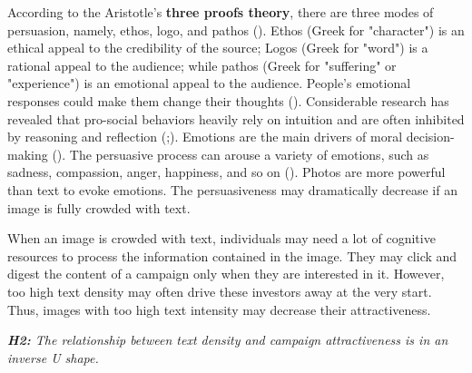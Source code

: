 \documentclass[a4paper]{article}
\begin{document}
According to the Aristotle's \textbf{three proofs theory}, there are three modes of persuasion, namely, ethos, logo, and pathos (\cite{alkhirbash_proposed_2016}). Ethos (Greek for "character") is an ethical appeal to the credibility of the source; Logos (Greek for "word") is a rational appeal to the audience; while pathos (Greek for "suffering" or "experience") is an emotional appeal to the audience. People's emotional responses could make them change their thoughts (\cite{alkhirbash_proposed_2016}). Considerable research has revealed that pro-social behaviors heavily rely on intuition and are often inhibited by reasoning and reflection (\cite{lindauer_comparing_2020};\cite{rand_spontaneous_2012}). Emotions are the main drivers of moral decision-making (\cite{lindauer_comparing_2020}). The persuasive process can arouse a variety of emotions, such as sadness, compassion, anger, happiness, and so on (\cite{wu_appeal_2022}). Photos are more powerful than text to evoke emotions. The persuasiveness may dramatically decrease if an image is fully crowded with text.  

 When an image is crowded with text, individuals may need a lot of cognitive resources to process the information contained in the image. They may click and digest the content of a campaign only when they are interested in it. However, too high text density may often drive these investors away at the very start. 
Thus, images with too high text intensity may decrease their attractiveness. 


\textit{\textbf{H2:} The relationship between text density and campaign attractiveness is in an inverse U shape. }
\end{document}
